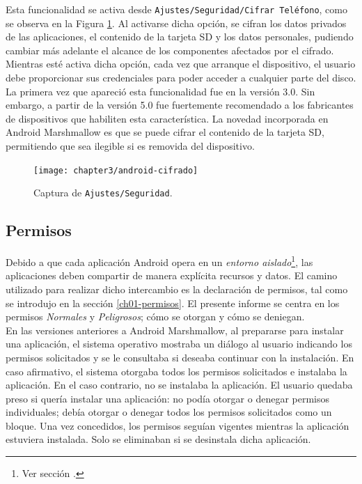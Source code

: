 Esta funcionalidad se activa desde \texttt{Ajustes/Seguridad/Cifrar Teléfono}, como se observa en la Figura \ref{fig:ch03:android-cifrado}. Al activarse dicha opción, se cifran los datos privados de las aplicaciones, el contenido de la tarjeta SD y los datos personales, pudiendo cambiar más adelante el alcance de los componentes afectados por el cifrado. Mientras esté activa dicha opción, cada vez que arranque el dispositivo, el usuario debe proporcionar sus credenciales para poder acceder a cualquier parte del disco.\\

La primera vez que apareció esta funcionalidad fue en la versión 3.0. Sin embargo, a partir de la versión 5.0 fue fuertemente recomendado a los fabricantes de dispositivos que habiliten esta característica. La novedad incorporada en Android Marshmallow es que se puede cifrar el contenido de la tarjeta SD, permitiendo que sea ilegible si es removida del dispositivo.
\begin{figure}[htbp]
	\begin{center}
		\texttt{[image: chapter3/android-cifrado]}
		\caption{Captura de \texttt{Ajustes/Seguridad}.}
		\label{fig:ch03:android-cifrado}
	\end{center}
\end{figure}
\subsection{Permisos}\label{ch03-permisos}
Debido a que cada aplicación Android opera en un \emph{entorno aislado}\footnote{Ver sección .}, las aplicaciones deben compartir de manera explícita recursos y datos. El camino utilizado para realizar dicho intercambio es la declaración de permisos, tal como se introdujo en la sección \ref{ch01-permisos}. El presente informe se centra en los permisos \emph{Normales} y \emph{Peligrosos}; cómo se otorgan y cómo se deniegan.\\

En las versiones anteriores a Android Marshmallow, al prepararse para instalar una aplicación, el sistema operativo mostraba un diálogo al usuario indicando los permisos solicitados y se le consultaba si deseaba continuar con la instalación. En caso afirmativo, el sistema otorgaba todos los permisos solicitados e instalaba la aplicación. En el caso contrario, no se instalaba la aplicación. El usuario quedaba preso si quería instalar una aplicación: no podía otorgar o denegar permisos individuales; debía otorgar o denegar todos los permisos solicitados como un bloque. Una vez concedidos, los permisos seguían vigentes mientras la aplicación estuviera instalada. Solo se eliminaban si se desinstala dicha aplicación.\\

